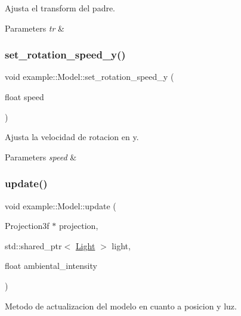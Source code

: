 Ajusta el transform del padre. 


\begin{DoxyParams}{Parameters}
{\em tr} & \\
\hline
\end{DoxyParams}
\mbox{\label{classexample_1_1_model_a81c93ba8b5c79f79e4f33a3bf826c0ae}} 
\subsubsection{\texorpdfstring{set\_rotation\_speed\_y()}{set\_rotation\_speed\_y()}}
{\footnotesize\ttfamily void example\+::\+Model\+::set\+\_\+rotation\+\_\+speed\+\_\+y (\begin{DoxyParamCaption}\item[{float}]{speed }\end{DoxyParamCaption})\hspace{0.3cm}{\ttfamily [inline]}}



Ajusta la velocidad de rotacion en y. 


\begin{DoxyParams}{Parameters}
{\em speed} & \\
\hline
\end{DoxyParams}
\mbox{\label{classexample_1_1_model_a50162748d338240194f9072c3ea452eb}} 
\subsubsection{\texorpdfstring{update()}{update()}}
{\footnotesize\ttfamily void example\+::\+Model\+::update (\begin{DoxyParamCaption}\item[{Projection3f $\ast$}]{projection,  }\item[{std\+::shared\+\_\+ptr$<$ \mbox{\hyperlink{classexample_1_1_light}{Light}} $>$}]{light,  }\item[{float}]{ambiental\+\_\+intensity }\end{DoxyParamCaption})}



Metodo de actualizacion del modelo en cuanto a posicion y luz. 


